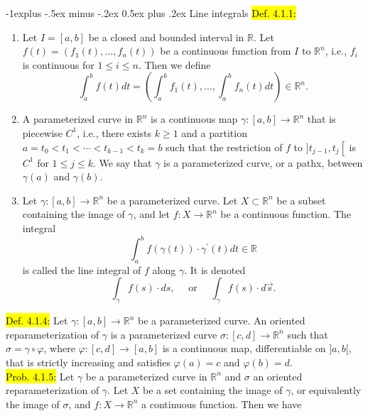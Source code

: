 \documentclass[10pt,landscape]{article}
\makeatletter
\newcommand{\yellow}[1]{\sethlcolor{yellow} \hl{#1}}
\newcommand{\blue}[1]{\sethlcolor{cyan} \hl{#1}}
\renewcommand{\subsection}{\@startsection{subsection}{2}{0mm}%
                                {-1explus -.5ex minus -.2ex}%
                                {0.5ex plus .2ex}%
                                {\normalfont\normalsize\bfseries}}
\makeatother
\begin{document}
\begin{multicols}{3}
\subsection{Line integrals}
\blue{Def. 4.1.1:}
\begin{enumerate}
        \item Let $I=[a, b]$ be a closed and bounded interval in $\mathbb{R}$. Let
        $f(t)=\left(f_{1}(t), \ldots, f_{n}(t)\right)$
        be a continuous function from $I$ to $\mathbb{R}^{n}$, i.e., $f_{i}$ is continuous for $1 \leqslant i \leqslant n$. Then we define
        $$
        \int_{a}^{b} f(t) d t=\left(\int_{a}^{b} f_{1}(t), \ldots, \int_{a}^{b} f_{n}(t) d t\right) \in \mathbb{R}^{n} .
        $$
        \item A parameterized curve in $\mathbb{R}^{n}$ is a continuous map $\gamma:[a, b] \rightarrow \mathbb{R}^{n}$ that is piecewise $C^{1}$, i.e., there exists $k \geqslant 1$ and a partition
        $a=t_{0}<t_{1}<\cdots<t_{k-1}<t_{k}=b$
        such that the restriction of $f$ to $] t_{j-1}, t_{j}\left[\right.$ is $C^{1}$ for $1 \leqslant j \leqslant k$. We say that $\gamma$ is a parameterized curve, or a pathx, between $\gamma(a)$ and $\gamma(b)$.
        \item Let $\gamma:[a, b] \rightarrow \mathbb{R}^{n}$ be a parameterized curve. Let $X \subset \mathbb{R}^{n}$ be a subset containing the image of $\gamma$, and let $f: X \rightarrow \mathbb{R}^{n}$ be a continuous function. The integral
        $$
        \int_{a}^{b} f(\gamma(t)) \cdot \gamma^{\prime}(t) d t \in \mathbb{R}
        $$
        is called the line integral of $f$ along $\gamma$. It is denoted
        $$
        \int_{\gamma} f(s) \cdot d s, \quad \text { or } \quad \int_{\gamma} f(s) \cdot d \vec{s} .
        $$
\end{enumerate}
\blue{Def. 4.1.4: } Let $\gamma:[a, b] \rightarrow \mathbb{R}^{n}$ be a parameterized curve. 
An oriented reparameterization of $\gamma$ is a parameterized curve $\sigma:[c, d] \rightarrow \mathbb{R}^{n}$ such that $\sigma=\gamma \circ \varphi$, 
where $\varphi:[c, d] \rightarrow[a, b]$ is a continuous map, differentiable on $] a, b[$, that is strictly increasing and satisfies $\varphi(a)=c$ and $\varphi(b)=d$.\\
\yellow{Prob. 4.1.5:} Let $\gamma$ be a parameterized curve in $\mathbb{R}^{n}$ and $\sigma$ an oriented reparameterization of $\gamma .$ Let $X$ be a set containing the image of $\gamma$, or equivalently the image of $\sigma$, and $f: X \rightarrow \mathbb{R}^{n}$ a continuous function. Then we have

\end{multicols}
\end{document}
